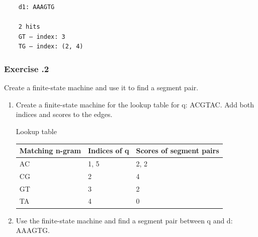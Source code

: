 \begin{verbatim}
    d1: AAAGTG 
    
    2 hits
    GT – index: 3
    TG – index: (2, 4)
\end{verbatim}

%
%
\subsubsection*{Exercise \thesection.2}
Create a finite-state machine and use it to find a segment pair.


\begin{enumerate}
\item Create a finite-state machine for the lookup table for q: ACGTAC. Add both indices and scores to the edges.

\medskip 
Lookup table
\begin{table}[H]
\centering
\small
\begin{tabular}{|l|l|l|}
\hline
\textbf{Matching n-gram} & \textbf{Indices of q} & \textbf{Scores of segment pairs} \\ \hline
AC                       & 1, 5                  & 2, 2                             \\ \hline
CG                       & 2                     & 4                                \\ \hline
GT                       & 3                     & 2                                \\ \hline
TA                       & 4                     & 0                                \\ \hline
\end{tabular}
\end{table}

\item Use the finite-state machine and find a segment pair between q and d: AAAGTG.
\end{enumerate}

\bigskip 

%
